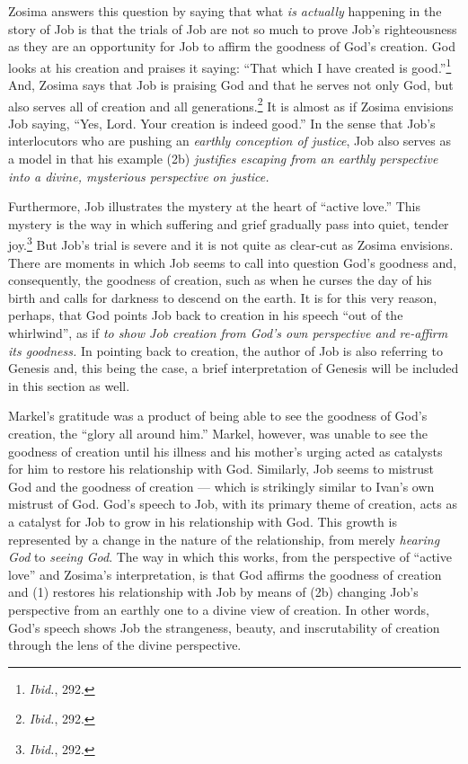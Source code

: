 Zosima answers this question by saying that what \emph{is actually} happening in the story of Job is that the trials of Job are not so much to prove Job's righteousness as they are an opportunity for Job to affirm the goodness of God's creation. God looks at his creation and praises it saying: ``That which I have created is good.''\footnote{\emph{Ibid.}, 292.} And, Zosima says that Job is praising God and that he serves not only God, but also serves all of creation and all generations.\footnote{\emph{Ibid.}, 292.} It is almost as if Zosima envisions Job saying, ``Yes, Lord. Your creation is indeed good.'' In the sense that Job's interlocutors who are pushing an \emph{earthly conception of justice}, Job also serves as a model in that his example (2b) \emph{justifies escaping from an earthly perspective into a divine, mysterious perspective on justice.}

Furthermore, Job illustrates the mystery at the heart of ``active love.'' This mystery is the way in which suffering and grief gradually pass into quiet, tender joy.\footnote{\emph{Ibid.}, 292.} But Job's trial is severe and it is not quite as clear-cut as Zosima envisions. There are moments in which Job seems to call into question God's goodness and, consequently, the goodness of creation, such as when he curses the day of his birth and calls for darkness to descend on the earth. It is for this very reason, perhaps, that God points Job back to creation in his speech ``out of the whirlwind'', as if \emph{to show Job creation from God's own perspective and re-affirm its goodness.} In pointing back to creation, the author of Job is also referring to Genesis and, this being the case, a brief interpretation of Genesis will be included in this section as well.

Markel's gratitude was a product of being able to see the goodness of God's creation, the ``glory all around him.'' Markel, however, was unable to see the goodness of creation until his illness and his mother's urging acted as catalysts for him to restore his relationship with God. Similarly, Job seems to mistrust God and the goodness of creation --- which is strikingly similar to Ivan's own mistrust of God. God's speech to Job, with its primary theme of creation, acts as a catalyst for Job to grow in his relationship with God. This growth is represented by a change in the nature of the relationship, from merely \emph{hearing God} to \emph{seeing God}. The way in which this works, from the perspective of ``active love'' and Zosima's interpretation, is that God affirms the goodness of creation and (1) restores his relationship with Job by means of (2b) changing Job's perspective from an earthly one to a divine view of creation. In other words, God's speech shows Job the strangeness, beauty, and inscrutability of creation through the lens of the divine perspective.

